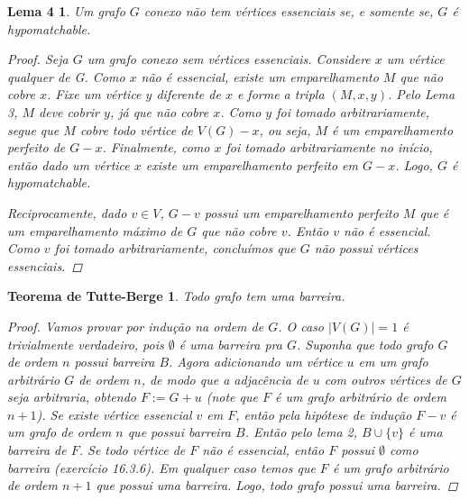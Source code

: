 \documentclass[a4paper,12pt]{article}
\newtheorem*{4}{Lema 4}
\newtheorem*{5}{Teorema de Tutte-Berge}
\begin{document}
\begin{4}

Um grafo $G$ conexo não tem vértices essenciais se, e somente se, $G$ é hypomatchable.

\begin{proof}

Seja $G$ um grafo conexo sem vértices essenciais. Considere $x$ um vértice qualquer de G. Como $x$ não é essencial, existe um emparelhamento $M$ que não cobre $x$. Fixe um vértice $y$ diferente de $x$ e forme a tripla $(M,x,y)$. Pelo Lema 3, $M$ deve cobrir $y$, já que não cobre $x$. Como $y$ foi tomado arbitrariamente, segue que $M$ cobre todo vértice de $V(G) - x$, ou seja, $M$ é um emparelhamento perfeito de $G - x$. Finalmente, como $x$ foi tomado arbitrariamente no início, então dado um vértice $x$ existe um emparelhamento perfeito em $G - x$. Logo, $G$ é hypomatchable.

Reciprocamente, dado $v \in V$, $G-v$ possui um emparelhamento perfeito $M$ que é um emparelhamento máximo de $G$ que não cobre $v$. Então $v$ não é essencial. Como $v$ foi tomado arbitrariamente, concluímos que $G$ não possui vértices essenciais. 

\end{proof}

\end{4}

\begin{5}

Todo grafo tem uma barreira.

\begin{proof}

Vamos provar por indução na ordem de $G$. O caso $|V(G)|=1$ é trivialmente verdadeiro, pois $\emptyset$ é uma barreira pra $G$. Suponha que todo grafo $G$ de ordem $n$ possui barreira $B$. Agora adicionando um vértice $u$ em um grafo arbitrário $G$ de ordem $n$, de modo que a adjacência de $u$ com outros vértices de $G$ seja arbitraria, obtendo $F := G + u$ (note que $F$ é um grafo arbitrário de ordem $n+1$). Se existe vértice essencial $v$ em $F$, então pela hipótese de indução $F - v$ é um grafo de ordem $n$ que possui barreira $B$. Então pelo lema 2, $B \cup \{v\}$ é uma barreira de $F$. Se todo vértice de $F$ não é essencial, então $F$ possui $\emptyset$ como barreira (exercício 16.3.6). Em qualquer caso temos que $F$ é um grafo arbitrário de ordem $n + 1$ que possui uma barreira. Logo, todo grafo possui uma barreira.

\end{proof}

\end{5}
\end{document}
